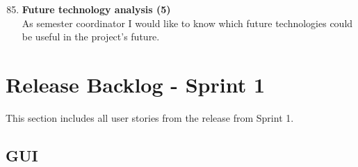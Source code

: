 \begin{enumerate}
	\setcounter{enumi}{84} %
	\item \textbf{Future technology analysis (5)}\\
	As semester coordinator I would like to know which future technologies could be useful in the project’s future.
\end{enumerate}

\section{Release Backlog - Sprint 1}
This section includes all user stories from the release from Sprint 1.

\subsection{GUI}

